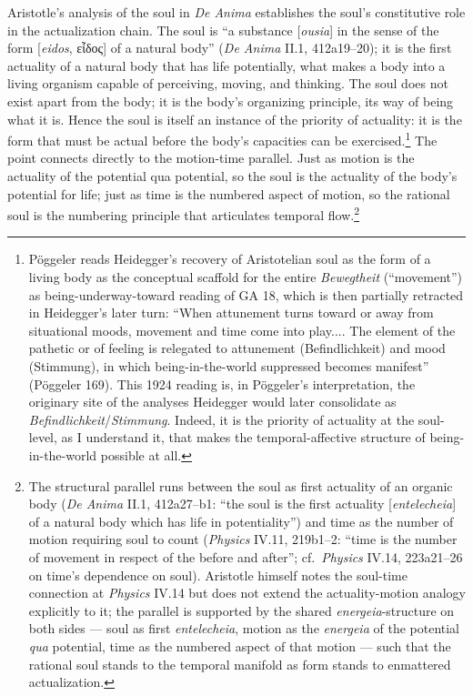 \documentclass{article}
\newcommand{\gk}[1]{{\greekfont #1}}
\begin{document}
Aristotle's analysis of the soul in \textit{De Anima} establishes the soul's constitutive role in the actualization chain. The soul is ``a substance [\textit{ousia}] in the sense of the form [\textit{eidos}, \gk{εἶδος}] of a natural body'' (\textit{De Anima} II.1, 412a19--20); it is the first actuality of a natural body that has life potentially, what makes a body into a living organism capable of perceiving, moving, and thinking. The soul does not exist apart from the body; it is the body's organizing principle, its way of being what it is. Hence the soul is itself an instance of the priority of actuality: it is the form that must be actual before the body's capacities can be exercised.\footnote{Pöggeler reads Heidegger's recovery of Aristotelian soul as the form of a living body as the conceptual scaffold for the entire \textit{Bewegtheit} (``movement'') as being-underway-toward reading of GA 18, which is then partially retracted in Heidegger's later turn: ``When attunement turns toward or away from situational moods, movement and time come into play.... The element of the pathetic or of feeling is relegated to attunement (Befindlichkeit) and mood (Stimmung), in which being-in-the-world suppressed becomes manifest'' (Pöggeler 169). This 1924 reading is, in Pöggeler's interpretation, the originary site of the analyses Heidegger would later consolidate as \textit{Befindlichkeit}/\textit{Stimmung}. Indeed, it is the priority of actuality at the soul-level, as I understand it, that makes the temporal-affective structure of being-in-the-world possible at all.} The point connects directly to the motion-time parallel. Just as motion is the actuality of the potential qua potential, so the soul is the actuality of the body's potential for life; just as time is the numbered aspect of motion, so the rational soul is the numbering principle that articulates temporal flow.\footnote{The structural parallel runs between the soul as first actuality of an organic body (\textit{De Anima} II.1, 412a27--b1: ``the soul is the first actuality [\textit{entelecheia}] of a natural body which has life in potentiality'') and time as the number of motion requiring soul to count (\textit{Physics} IV.11, 219b1--2: ``time is the number of movement in respect of the before and after''; cf.\ \textit{Physics} IV.14, 223a21--26 on time's dependence on soul). Aristotle himself notes the soul-time connection at \textit{Physics} IV.14 but does not extend the actuality-motion analogy explicitly to it; the parallel is supported by the shared \textit{energeia}-structure on both sides --- soul as first \textit{entelecheia}, motion as the \textit{energeia} of the potential \textit{qua} potential, time as the numbered aspect of that motion --- such that the rational soul stands to the temporal manifold as form stands to enmattered actualization.}
\end{document}
